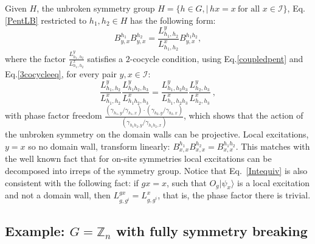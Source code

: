 \documentclass[aps,pra,export,nofootinbib]{revtex4-2}
\begin{document}
Given $H$, the unbroken symmetry group $H=\{h\in G,|\,hx=x\ \mbox{for all\ }x\in \mathcal{I}\}$, Eq.\eqref{PentLB} restricted to  $h_1, h_2 \in H$ has the following form:
$$ B^{h_1}_{y,x} B^{h_2}_{y,x}=  \frac{L^{y}_{h_1,h_2}}{L^{x}_{h_1,h_2}} B^{h_1h_2}_{y,x}, $$ 
where the factor $\frac{L^{y}_{h_1,h_2}}{L^{x}_{h_1,h_2}}$ satisfies a $2$-cocycle condition, using Eq.\eqref{coupledpent} and Eq.\eqref{3cocycleeq}, for every pair $y,x \in \mathcal{I}$:
$$ \frac{ L^{y}_{h_1,h_2}}{L^{x}_{h_1,h_2}}
\frac{ L^{y}_{h_1h_2,h_3}}{L^{x}_{h_1h_2,h_3}} = 
\frac{ L^{y}_{h_1,h_2h_3}}{L^{x}_{h_1,h_2h_3}} 
\frac{ L^{y}_{h_2,h_3}}{L^{x}_{h_2,h_3}} \ ,$$
with phase factor freedom $\frac{(\gamma_{h_1,y}/\gamma_{h_1,x}) \cdot (\gamma_{h_2,y}/\gamma_{h_2,x}) }{ (\gamma_{h_1h_2,y}/\gamma_{h_1h_2,x})}$, which shows that the action of the unbroken symmetry on the domain walls can be projective. Local excitations, $y=x$ so no domain wall, transform linearly: $B^{h_1}_{x,x} B^{h_2}_{x,x}= B^{h_1h_2}_{x,x}$. This matches with the well known fact that for on-site symmetries local excitations can be decomposed into irreps of the symmetry group. Notice that Eq.\ \eqref{Intequiv} is also consistent with the following fact:  if $gx=x$, such that $O_g |\psi_x\rangle$ is a local excitation and not a domain wall, then $L^{gx}_{g,g^i}= L^{x}_{g,g^i}$, that is, the  phase factor there is trivial.

\subsection{Example: $ G = \mathbb{Z}_n$ with fully symmetry breaking } 
\end{document}
